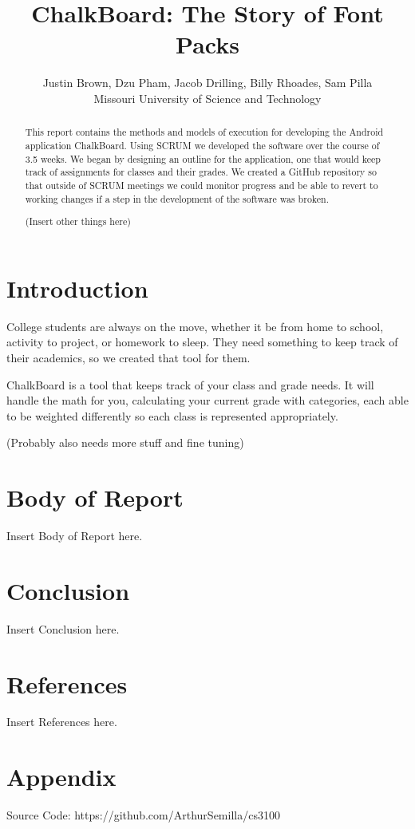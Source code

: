 \documentclass[a4paper]{article} %
\date{} %
\def\titulo#1{\title{#1}} %
\def\autores#1{\author{#1}} %
\begin{document}
\titulo{ChalkBoard: The Story of Font Packs}

\autores{Justin Brown, Dzu Pham, Jacob Drilling, Billy Rhoades, Sam Pilla \\ %
       Missouri University of Science and Technology \\
       }%
\doublespace

\maketitle

\thispagestyle{empty}




\begin{abstract}

This report contains the methods and models of execution for developing the Android application ChalkBoard. Using SCRUM we developed the software over the course of 3.5 weeks. We began by designing an outline for the application, one that would keep track of assignments for classes and their grades. We created a GitHub repository so that outside of SCRUM meetings we could monitor progress and be able to revert to working changes if a step in the development of the software was broken.

(Insert other things here)

\end{abstract}

\section*{Introduction}

College students are always on the move, whether it be from home to school, activity to project, or homework to sleep. They need something to keep track of their academics, so we created that tool for them.

ChalkBoard is a tool that keeps track of your class and grade needs. It will handle the math for you, calculating your current grade with categories, each able to be weighted differently so each class is represented appropriately.

(Probably also needs more stuff and fine tuning)

\section*{Body of Report}

Insert Body of Report here.

\section*{Conclusion}

Insert Conclusion here.

\section*{References}

Insert References here.

\section*{Appendix}

Source Code: https://github.com/ArthurSemilla/cs3100
\end{document}
